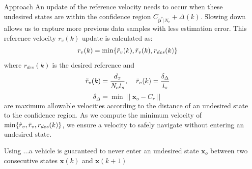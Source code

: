 \begin{section}{Approach}
An update of the reference velocity needs to occur when these undesired states are within the confidence region $ C_{\bar{\bm{p}}^*|N_e}+\Delta(k)$. Slowing down allows us to capture more previous data samples with less estimation error. This reference velocity $r_v(k)$ update is calculated as:
    \begin{equation}
    \label{eq:ref_vel}
        r_v(k) = \min\{\Tilde{r}_v(k), \bar{r}_v(k) ,r_{des}(k)\}
	\end{equation}
where $r_{des}(k)$ is the desired reference and
	\begin{equation}
	    \Tilde{r}_v(k) = \frac{d_x}{N_et_s}, \;\;\;\; \bar{r}_v(k) = \frac{\delta_{\Delta}}{t_s}
	\end{equation}
	\begin{equation}
	    \delta_{\Delta} = \min \lVert \bm{x}_o - C_r \rVert 
	\end{equation}
are maximum allowable velocities according to the distance of an undesired state to the confidence region. As we compute the minimum velocity of $\min\{\Tilde{r}_v,\bar{r}_v,r_{des}(k)\}$, we ensure a velocity to safely navigate without entering an undesired state.

\begin{lemma} 
	\label{lemma_2}
Using ...a vehicle is guaranteed to never enter an undesired state $\bm{x}_o$ between two consecutive states $\bm{x}(k)$ and $\bm{x}(k+1)$


\end{lemma}


\end{section}
